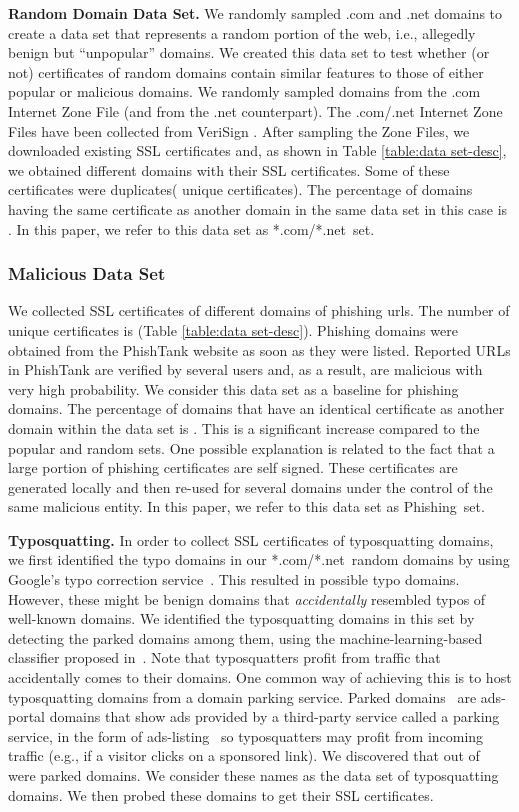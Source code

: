\documentclass[twocolumn]{article}
\newcommand{\descr}[1]{\bigskip \noindent \textbf{#1}}
\newcommand{\phishing}{\textsf{Phishing}}
\newcommand{\comnet}{\textsf{*.com/*.net}}
\begin{document}
\descr{Random Domain Data Set.}
We randomly sampled .com and .net domains to create a data set that represents a random portion of 
the web, i.e., allegedly benign but ``unpopular'' domains. We 
created this data set to test whether (or not) certificates of random domains contain similar features to those of either popular 
or malicious domains. We randomly sampled  domains from the .com Internet Zone File (and  from the .net counterpart).
The .com/.net Internet Zone Files have been collected from VeriSign \cite{verisignurl}. After sampling the Zone Files, we downloaded 
existing SSL certificates and, as shown in Table \ref{table:data set-desc}, we obtained  different domains 
with their SSL certificates. Some of these certificates were duplicates( unique certificates). The 
percentage of domains having the same certificate as another domain in the same data set in this case is . In this paper, we 
refer to this data set as \comnet\ set.


\subsubsection{Malicious Data Set}
 We collected SSL certificates of  different domains of phishing urls. The number of 
unique certificates is  (Table \ref{table:data set-desc}). Phishing domains were obtained from the PhishTank 
website \cite{phishtank} as soon as they were listed. Reported
URLs in PhishTank are verified by several users and, as a result, are malicious with very high
probability. We consider this data set as a baseline for phishing domains. The percentage of domains that have an identical certificate as another 
domain within the data set is . This is a significant increase compared to the popular and random sets. One possible explanation 
is related to the fact that a large portion of phishing certificates are self signed. These 
certificates are generated locally and then re-used for several domains under the control of the same 
malicious entity. In this paper, we refer to this data set as \phishing\ set. 

\descr{Typosquatting.} 
In order to collect SSL certificates of typosquatting domains,
we first identified the typo domains in our \comnet\ random domains  by 
using Google's typo correction service~\cite{GoogleSpellChecker}. This resulted in  possible typo domains. 
However, these might be benign domains that {\em accidentally} resembled typos of well-known domains. 
We identified the typosquatting domains in this set by detecting the parked domains 
among them, using the machine-learning-based  classifier proposed in~\cite{ads-portal-class}.
Note that typosquatters profit 
from traffic that accidentally comes to their domains. 
One common way of achieving this is to host typosquatting domains from a domain parking 
service. Parked domains~\cite{parked} are ads-portal domains that 
show ads provided by a third-party service called a parking service, in the 
form of ads-listing~\cite{Wang} so typosquatters may profit from incoming traffic 
(e.g., if a visitor clicks on a sponsored link). 
We discovered that  out of  were parked domains. We consider these  names 
as the data set of typosquatting domains. We then probed these domains to get their SSL certificates. 
\end{document}
